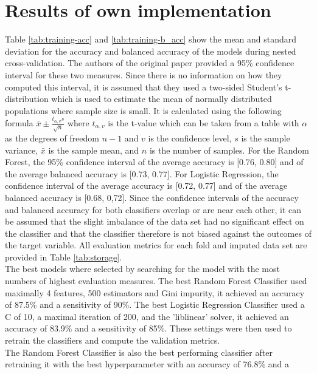 \section{Results of own implementation}
Table \ref{tab:training-acc} and \ref{tab:training-b_acc} show the mean and 
standard deviation for the accuracy and balanced accuracy of the models during 
nested cross-validation. The authors of the original paper provided a 95\% 
confidence interval for these two measures. Since there is no information on 
how they computed this interval, it is assumed that they used a two-sided 
Student's t-distribution which is used to estimate the mean of normally 
distributed populations where sample size is small. It is calculated using the 
following formula $\bar{x} \pm \frac{t_{\alpha, v}s}{\sqrt{n}}$ where 
$t_{\alpha, v}$ is the t-value which can be taken from a table with $\alpha$ 
as the degrees of freedom $n-1$ and $v$ is the confidence level, $s$ is the 
sample variance, $\bar{x}$ is the sample mean, and $n$ is the number of samples.
For the Random Forest, the 95\% confidence interval of the average accuracy is 
[0.76, 0.80] and of the average balanced accuracy is [0.73, 0.77]. For Logistic 
Regression, the confidence interval of the average accuracy is [0.72, 0.77] and 
of the average balanced accuracy is [0.68, 0,72]. Since the confidence 
intervals of the accuracy and balanced accuracy for both classifiers overlap or 
are near each other, it can be assumed that the slight imbalance of the data 
set had no significant effect on the classifier and that the classifier 
therefore 
is not biased against the outcomes of the target variable. All evaluation 
metrics for each fold and imputed data set are provided in Table 
\ref{tab:storage}.
\\
The best models where selected by searching for the model with the most numbers 
of highest evaluation measures. The best Random Forest Classifier used 
maximally 
4 features, 500 estimators and Gini impurity, it achieved an accuracy of 87.5\% 
and a 
sensitivity of 90\%. The best Logistic Regression Classifier used a C of 10, a 
maximal iteration of 200, and the 'liblinear' solver, it achieved an accuracy 
of 83.9\% and a sensitivity of 85\%. These settings were then used to retrain 
the classifiers and compute the validation metrics.
\\
The Random Forest Classifier is also the best performing classifier after 
retraining it with the best hyperparameter with an accuracy of 76.8\% and a 
